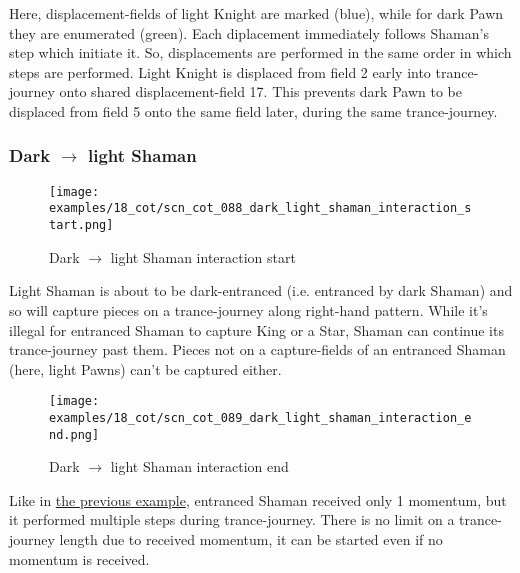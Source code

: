 Here, displacement-fields of light Knight are marked (blue), while for dark Pawn
they are enumerated (green). Each diplacement immediately follows Shaman's step
which initiate it. So, displacements are performed in the same order in which steps
are performed. Light Knight is displaced from field 2 early into trance-journey
onto shared displacement-field 17. This prevents dark Pawn to be displaced from
field 5 onto the same field later, during the same trance-journey.

\clearpage %

\subsubsection*{Dark $\rightarrow$ light Shaman}
\label{sec:Conquest of Tlalocan/Trance-journey/Interactions/Dark --> light Shaman}

\vspace*{-1.4\baselineskip}
\noindent
\begin{figure}[!h]
\texttt{[image: examples/18\_cot/scn\_cot\_088\_dark\_light\_shaman\_interaction\_start.png]}
\caption{Dark $\rightarrow$ light Shaman interaction start}
\label{fig:scn_cot_088_dark_light_shaman_interaction_start}
\end{figure}

Light Shaman is about to be dark-entranced (i.e. entranced by dark Shaman) and
so will capture pieces on a trance-journey along right-hand pattern. While it's
illegal for entranced Shaman to capture King or a Star, Shaman can continue its
trance-journey past them. Pieces not on a capture-fields of an entranced Shaman
(here, light Pawns) can't be captured either.

\clearpage %

\noindent
\begin{figure}[!h]
\texttt{[image: examples/18\_cot/scn\_cot\_089\_dark\_light\_shaman\_interaction\_end.png]}
\caption{Dark $\rightarrow$ light Shaman interaction end}
\label{fig:scn_cot_089_dark_light_shaman_interaction_end}
\end{figure}

Like in
\hyperref[fig:scn_cot_086_light_light_shaman_interaction_start]{the previous example},
entranced Shaman received only 1 momentum, but it performed multiple steps during
trance-journey. There is no limit on a trance-journey length due to received momentum,
it can be started even if no momentum is received.

